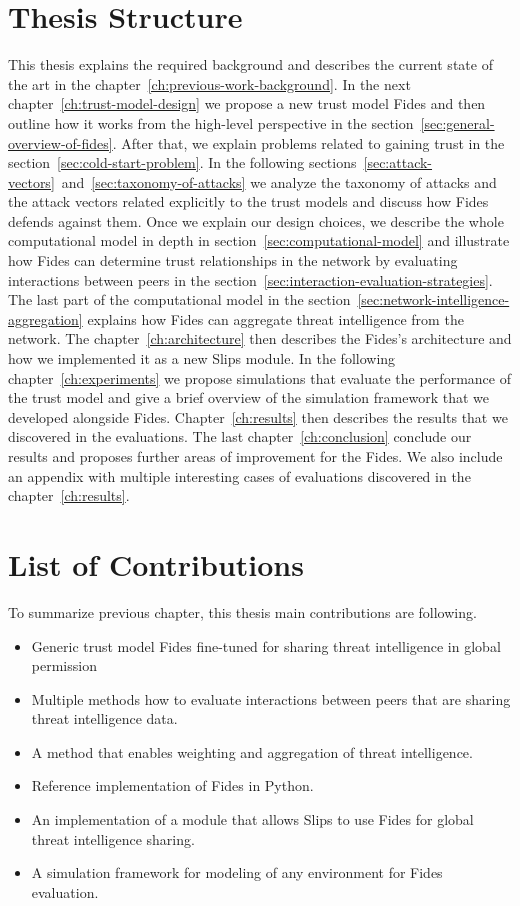 \section{Thesis Structure}
\label{sec:thesis-structure}
This thesis explains the required background and describes the current state of the art in the chapter~\ref{ch:previous-work-background}.
In the next chapter~\ref{ch:trust-model-design} we propose a new trust model Fides and then outline how it works from the high-level perspective in the section~\ref{sec:general-overview-of-fides}.
After that, we explain problems related to gaining trust in the section~\ref{sec:cold-start-problem}.
In the following sections~\ref{sec:attack-vectors}~and~\ref{sec:taxonomy-of-attacks} we analyze the taxonomy of attacks and the attack vectors related explicitly to the trust models and discuss how Fides defends against them.
Once we explain our design choices, we describe the whole computational model in depth in section~\ref{sec:computational-model} and illustrate how Fides can determine trust relationships in the network by evaluating interactions between peers in the section~\ref{sec:interaction-evaluation-strategies}.
The last part of the computational model in the section~\ref{sec:network-intelligence-aggregation} explains how Fides can aggregate threat intelligence from the network.
The chapter~\ref{ch:architecture} then describes the Fides's architecture and how we implemented it as a new Slips module.
In the following chapter~\ref{ch:experiments} we propose simulations that evaluate the performance of the trust model and give a brief overview of the simulation framework that we developed alongside Fides.
Chapter~\ref{ch:results} then describes the results that we discovered in the evaluations. The last chapter~\ref{ch:conclusion} conclude our results and proposes further areas of improvement for the Fides. 
We also include an appendix with multiple interesting cases of evaluations discovered in the chapter~\ref{ch:results}.

\newpage
\section{List of Contributions}
\label{sec:list-of-contributions}
To summarize previous chapter, this thesis main contributions are following.
\begin{itemize}
    \item Generic trust model Fides fine-tuned for sharing threat intelligence in global permission
    \item Multiple methods how to evaluate interactions between peers that are sharing threat intelligence data.
    \item A method that enables weighting and aggregation of threat intelligence.
    \item Reference implementation of Fides in Python.
    \item An implementation of a module that allows Slips to use Fides for global threat intelligence sharing.
    \item A simulation framework for modeling of any environment for Fides evaluation.
\end{itemize}